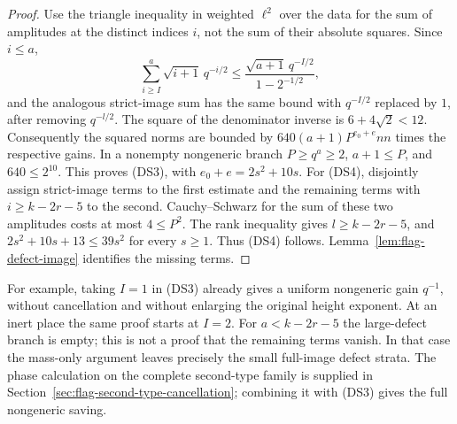 \begin{proof}
Use the triangle inequality in weighted \(\ell^2\)
over the data for the sum of amplitudes at the distinct
indices \(i\), not the sum of their absolute squares.
Since \(i\le a\),
\[
 \sum_{i\ge I}^{a}\sqrt{i+1}\,q^{-i/2}
 \le\frac{\sqrt{a+1}\,q^{-I/2}}{1-2^{-1/2}},
\]
and the analogous strict-image sum has the same bound
with \(q^{-I/2}\) replaced by \(1\), after removing
\(q^{-l/2}\). The square of the denominator inverse
is \(6+4\sqrt2<12\). Consequently the squared norms
are bounded by \(640(a+1)P^{e_0+e}nn\) times
the respective gains. In a nonempty nongeneric branch
\(P\ge q^a\ge2\), \(a+1\le P\), and \(640\le 2^{10}\).
This proves (DS3), with \(e_0+e=2s^2+10s\).
For (DS4), disjointly assign strict-image terms to
the first estimate and the remaining terms with
\(i\ge k-2r-5\) to the second. Cauchy--Schwarz for
the sum of these two amplitudes costs at most \(4\le P^2\).
The rank inequality gives \(l\ge k-2r-5\), and
\(2s^2+10s+13\le39s^2\) for every \(s\ge1\).
Thus (DS4) follows. Lemma~\ref{lem:flag-defect-image}
identifies the missing terms.
\end{proof}

For example, taking \(I=1\) in (DS3) already gives a
uniform nongeneric gain \(q^{-1}\), without cancellation
and without enlarging the original height exponent.
At an inert place the same proof starts at \(I=2\).
For \(a<k-2r-5\) the large-defect branch is empty;
this is not a proof that the remaining terms vanish.
In that case the mass-only argument leaves precisely
the small full-image defect strata. The phase calculation
on the complete second-type family is supplied in
Section~\ref{sec:flag-second-type-cancellation};
combining it with (DS3) gives the full nongeneric saving.
